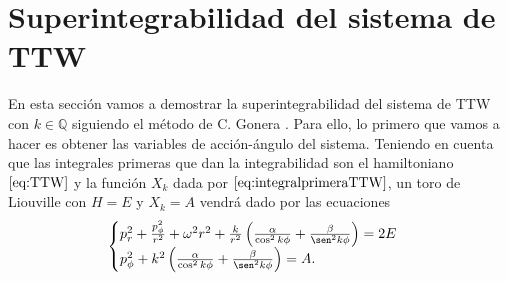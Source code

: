 \documentclass[11pt,a4paper,twoside]{article}
\theoremstyle{definition} \newtheorem{defn}[thm]{Definición}
\theoremstyle{definition} \newtheorem{ejemplo}[thm]{Ejemplo}
\theoremstyle{definition} \newtheorem{ejercicio}[thm]{Ejercicio}
\theoremstyle{remark} \newtheorem*{obs}{Observación}
\def\QQ{\mathbb{Q}}
\begin{document}
\section{Superintegrabilidad del sistema de TTW}\label{superintTTW}
En esta sección vamos a demostrar la superintegrabilidad del sistema de TTW con $k\in \QQ$ siguiendo el método de C. Gonera \cite{gonera}. Para ello, lo primero que vamos a hacer es obtener las variables de acción-ángulo del sistema. Teniendo en cuenta que las integrales primeras que dan la integrabilidad son el hamiltoniano $\eqref{eq:TTW}$ y la función $X_k$ dada por $\eqref{eq:integralprimeraTTW}$, un toro de Liouville con $H=E$ y $X_k=A$ vendrá dado por las ecuaciones
\begin{equation}
  \begin{cases}
    p_r^2+\frac{p_{\phi}^2}{r^2}+\omega^2r^2 + \frac{k}{r^2}\left( \frac{\alpha}{\cos^2k\phi} +\frac{\beta}{\sen^2k\phi}\right) = 2E \\
    p_{\phi}^2+k^2\left( \frac{\alpha}{\cos^2k\phi} +\frac{\beta}{\sen^2k\phi}\right)=A.
  \end{cases}
\end{equation}
\end{document}
